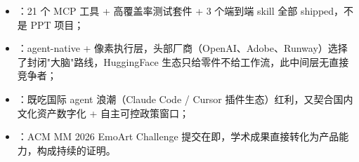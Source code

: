 \begin{itemize}
  \item {}：21 个 MCP 工具 + 高覆盖率测试套件 + 3 个端到端 skill 全部 shipped，不是 PPT 项目；
  \item {}：agent-native + 像素执行层，头部厂商（OpenAI、Adobe、Runway）选择了封闭"大脑"路线，HuggingFace 生态只给零件不给工作流，此中间层无直接竞争者；
  \item {}：既吃国际 agent 浪潮（Claude Code / Cursor 插件生态）红利，又契合国内文化资产数字化 + 自主可控政策窗口；
  \item {}：ACM MM 2026 EmoArt Challenge 提交在即，学术成果直接转化为产品能力，构成持续的证明。
\end{itemize}
